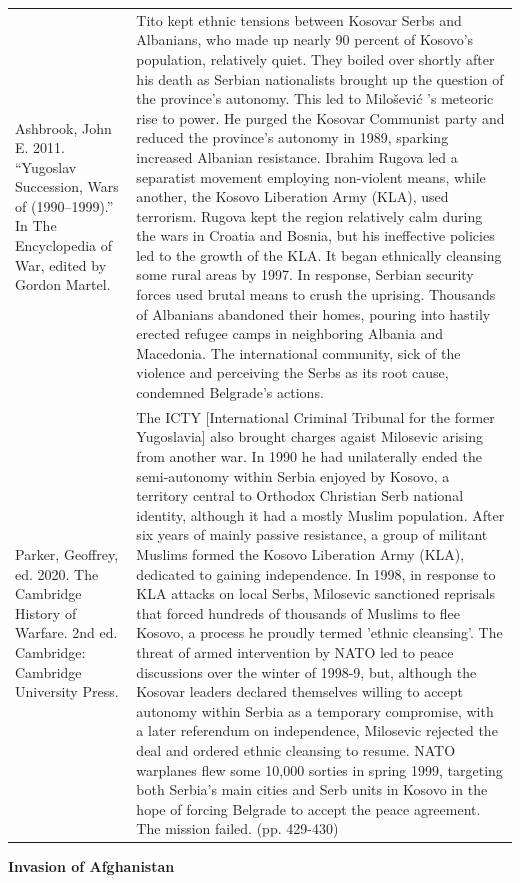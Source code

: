 {\begin{longtable}{p{}p{}}
Ashbrook, John E. 2011. “Yugoslav Succession, Wars of (1990–1999).” In The Encyclopedia of War, edited by Gordon Martel. & Tito kept ethnic tensions between Kosovar Serbs and Albanians, who made up nearly 90 percent of Kosovo's population, relatively quiet. They boiled over shortly after his death as Serbian nationalists brought up the question of the province's autonomy. This led to Milošević 's meteoric rise to power. He purged the Kosovar Communist party and reduced the province's autonomy in 1989, sparking increased Albanian resistance. Ibrahim Rugova led a separatist movement employing non-violent means, while another, the Kosovo Liberation Army (KLA), used terrorism. Rugova kept the region relatively calm during the wars in Croatia and Bosnia, but his ineffective policies led to the growth of the KLA. It began ethnically cleansing some rural areas by 1997. In response, Serbian security forces used brutal means to crush the uprising. Thousands of Albanians abandoned their homes, pouring into hastily erected refugee camps in neighboring Albania and Macedonia. The international community, sick of the violence and perceiving the Serbs as its root cause, condemned Belgrade's actions.
\\
Parker, Geoffrey, ed. 2020. The Cambridge History of Warfare. 2nd ed. Cambridge: Cambridge University Press. & The ICTY [International Criminal Tribunal for the former Yugoslavia] also brought charges agaist Milosevic arising from another war. In 1990 he had unilaterally ended the semi-autonomy within Serbia enjoyed by Kosovo, a territory central to Orthodox Christian Serb national identity, although it had a mostly Muslim population. After six years of mainly passive resistance, a group of militant Muslims formed the Kosovo Liberation Army (KLA), dedicated to gaining independence. In 1998, in response to KLA attacks on local Serbs, Milosevic sanctioned reprisals that forced hundreds of thousands of Muslims to flee Kosovo, a process he proudly termed 'ethnic cleansing'. The threat of armed intervention by NATO led to peace discussions over the winter of 1998-9, but, although the Kosovar leaders declared themselves willing to accept autonomy within Serbia as a temporary compromise, with a later referendum on independence, Milosevic rejected the deal and ordered ethnic cleansing to resume. NATO warplanes flew some 10,000 sorties in spring 1999, targeting both Serbia's main cities and Serb units in Kosovo in the hope of forcing Belgrade to accept the peace agreement. The mission failed. (pp. 429-430)
\\
\end{longtable}}
\clearpage
         \textbf{Invasion of Afghanistan} 

